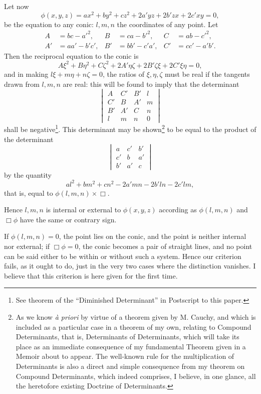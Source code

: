 \documentclass[11pt]{article}
\newcommand{\sourcepage}[1]{\marginpar{\scriptsize p.~#1}}
\begin{document}
\sourcepage{126}
Let now
\[
\phi(x,y,z)=ax^2+by^2+cz^2+2a'yz+2b'zx+2c'xy=0,
\]
be the equation to any conic: $l,m,n$ the coordinates of any point. Let
\[
\begin{aligned}
A&=bc-a'^2,& B&=ca-b'^2,& C&=ab-c'^2,\\
A'&=aa'-b'c',& B'&=bb'-c'a',& C'&=cc'-a'b'.
\end{aligned}
\]
Then the reciprocal equation to the conic is
\[
A\xi^2+B\eta^2+C\zeta^2+2A'\eta\zeta+2B'\zeta\xi+2C'\xi\eta=0,
\]
and in making $l\xi+m\eta+n\zeta=0$, the ratios of $\xi,\eta,\zeta$ must be real if the tangents drawn from $l,m,n$ are real: this will be found to imply that the determinant
\[
\begin{vmatrix}
A&C'&B'&l\\
C'&B&A'&m\\
B'&A'&C&n\\
l&m&n&0
\end{vmatrix}
\]
shall be negative\footnote{See theorem of the ``Diminished Determinant'' in Postscript to this paper.}. This determinant may be shown\footnote{As we know \emph{\`a priori} by virtue of a theorem given by M. Cauchy, and which is included as a particular case in a theorem of my own, relating to Compound Determinants, that is, Determinants of Determinants, which will take its place as an immediate consequence of my fundamental Theorem given in a Memoir about to appear. The well-known rule for the multiplication of Determinants is also a direct and simple consequence from my theorem on Compound Determinants, which indeed comprises, I believe, in one glance, all the heretofore existing Doctrine of Determinants.} to be equal to the product of the determinant
\[
\begin{vmatrix}
a&c'&b'\\
c'&b&a'\\
b'&a'&c
\end{vmatrix}
\]
by the quantity
\[
al^2+bm^2+cn^2-2a'mn-2b'ln-2c'lm,
\]
that is, equal to $\phi(l,m,n)\times\Box$.

Hence $l,m,n$ is internal or external to $\phi(x,y,z)$ according as $\phi(l,m,n)$ and $\Box\phi$ have the same or contrary sign.

If $\phi(l,m,n)=0$, the point lies on the conic, and the point is neither internal nor external; if $\Box\phi=0$, the conic becomes a pair of straight lines, and no point can be said either to be within or without such a system. Hence our criterion fails, as it ought to do, just in the very two cases where the distinction vanishes. I believe that this criterion is here given for the first time.
\end{document}
